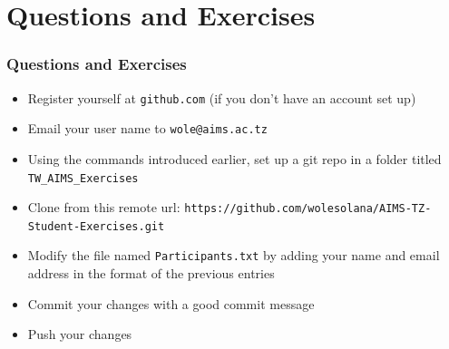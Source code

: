 \documentclass[10pt,t,sans,mathsans,xcolor=dvipsnames]{beamer}
\begin{document}
\section{Questions and Exercises}
\begin{frame}[fragile]
\frametitle{Questions and Exercises}
\begin{itemize}
\item Register yourself at \texttt{github.com} (if you don't have an account set up)
\item Email your user name to \texttt{wole@aims.ac.tz}
\item Using the commands introduced earlier, set up a git repo in a folder titled \texttt{TW\_AIMS\_Exercises}
\item Clone from this remote url: \texttt{https://github.com/wolesolana/AIMS-TZ-Student-Exercises.git}
\item Modify the file named \texttt{Participants.txt} by adding your name and email address in the format of the previous entries
\item Commit your changes with a good commit message
\item Push your changes
\end{itemize}
\end{frame}
\end{document}
